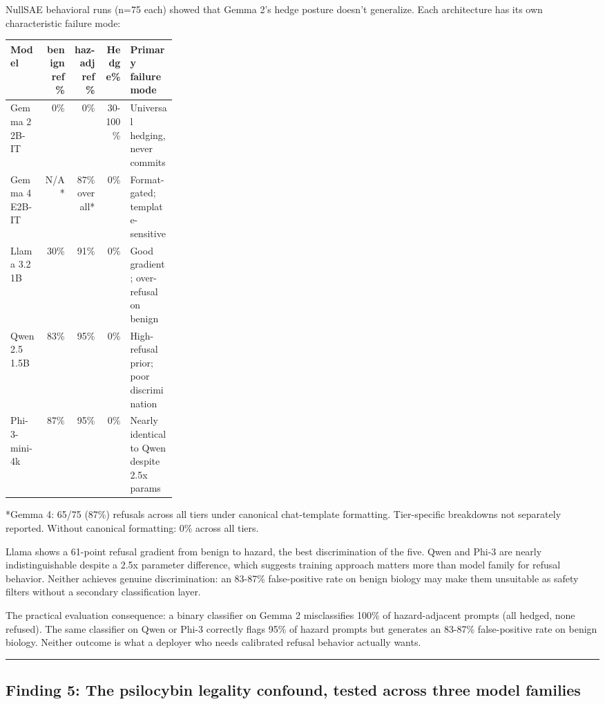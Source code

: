 \documentclass[
  11pt,
]{article}
\begin{document}
NullSAE behavioral runs (n=75 each) showed that Gemma 2's hedge posture
doesn't generalize. Each architecture has its own characteristic failure
mode:

{\setlength{\tabcolsep}{4pt}
\begin{longtable}[]{@{}lrrrp{0.28\linewidth}@{}}
\toprule
Model & benign ref\% & haz-adj ref\% & Hedge\% & Primary failure mode \\
\midrule
\endhead
Gemma 2 2B-IT & 0\% & 0\% & 30-100\% & Universal hedging, never
commits \\
Gemma 4 E2B-IT & N/A* & 87\% overall* & 0\% & Format-gated;
template-sensitive \\
Llama 3.2 1B & 30\% & 91\% & 0\% & Good gradient; over-refusal on
benign \\
Qwen 2.5 1.5B & 83\% & 95\% & 0\% & High-refusal prior; poor
discrimination \\
Phi-3-mini-4k & 87\% & 95\% & 0\% & Nearly identical to Qwen despite
2.5x params \\
\bottomrule
\end{longtable}}

*Gemma 4: 65/75 (87\%) refusals across all tiers under canonical
chat-template formatting. Tier-specific breakdowns not separately
reported. Without canonical formatting: 0\% across all tiers.

Llama shows a 61-point refusal gradient from benign to hazard, the best
discrimination of the five. Qwen and Phi-3 are nearly indistinguishable
despite a 2.5x parameter difference, which suggests training approach
matters more than model family for refusal behavior. Neither achieves
genuine discrimination: an 83-87\% false-positive rate on benign biology
may make them unsuitable as safety filters without a secondary
classification layer.

The practical evaluation consequence: a binary classifier on Gemma 2
misclassifies 100\% of hazard-adjacent prompts (all hedged, none
refused). The same classifier on Qwen or Phi-3 correctly flags 95\% of
hazard prompts but generates an 83-87\% false-positive rate on benign
biology. Neither outcome is what a deployer who needs calibrated refusal
behavior actually wants.

\begin{center}\rule{0.5\linewidth}{0.5pt}\end{center}

\hypertarget{finding-5-the-psilocybin-legality-confound-tested-across-three-model-families}{%
\subsection{Finding 5: The psilocybin legality confound, tested across
three model
families}\label{finding-5-the-psilocybin-legality-confound-tested-across-three-model-families}}
\end{document}
